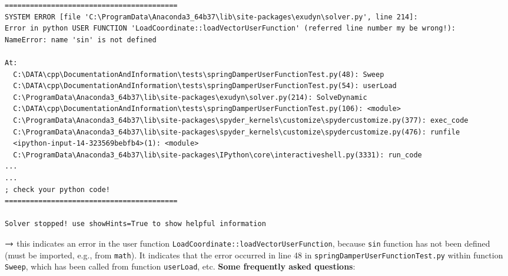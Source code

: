 	{\ttfamily \footnotesize
	\begin{lstlisting}[breaklines=true]
=========================================
SYSTEM ERROR [file 'C:\ProgramData\Anaconda3_64b37\lib\site-packages\exudyn\solver.py', line 214]: 
Error in python USER FUNCTION 'LoadCoordinate::loadVectorUserFunction' (referred line number my be wrong!):
NameError: name 'sin' is not defined

At:
  C:\DATA\cpp\DocumentationAndInformation\tests\springDamperUserFunctionTest.py(48): Sweep
  C:\DATA\cpp\DocumentationAndInformation\tests\springDamperUserFunctionTest.py(54): userLoad
  C:\ProgramData\Anaconda3_64b37\lib\site-packages\exudyn\solver.py(214): SolveDynamic
  C:\DATA\cpp\DocumentationAndInformation\tests\springDamperUserFunctionTest.py(106): <module>
  C:\ProgramData\Anaconda3_64b37\lib\site-packages\spyder_kernels\customize\spydercustomize.py(377): exec_code
  C:\ProgramData\Anaconda3_64b37\lib\site-packages\spyder_kernels\customize\spydercustomize.py(476): runfile
  <ipython-input-14-323569bebfb4>(1): <module>
  C:\ProgramData\Anaconda3_64b37\lib\site-packages\IPython\core\interactiveshell.py(3331): run_code
...
...
; check your python code!
=========================================

Solver stopped! use showHints=True to show helpful information
	\end{lstlisting}
	}
	\item[] $\rightarrow$ this indicates an error in the user function \texttt{LoadCoordinate::loadVectorUserFunction}, because
	\texttt{sin} function has not been defined (must be imported, e.g., from \texttt{math}).
	It indicates that the error occurred in line 48 in \texttt{springDamperUserFunctionTest.py} within function \texttt{Sweep},
	which has been called from function \texttt{userLoad}, etc.
\ei
{\bf Some frequently asked questions}:
\bn
